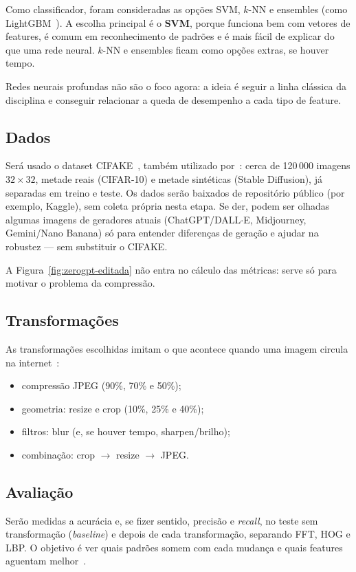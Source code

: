 \documentclass[12pt]{article}
\begin{document}
Como classificador, foram consideradas as opções SVM, $k$-NN e ensembles (como LightGBM~\cite{nirob2026handcrafted}). A escolha principal é o \textbf{SVM}, porque funciona bem com vetores de features, é comum em reconhecimento de padrões e é mais fácil de explicar do que uma rede neural. $k$-NN e ensembles ficam como opções extras, se houver tempo.

Redes neurais profundas não são o foco agora: a ideia é seguir a linha clássica da disciplina e conseguir relacionar a queda de desempenho a cada tipo de feature.

\subsection{Dados}

Será usado o dataset CIFAKE~\cite{bird2024cifake}, também utilizado por~\cite{nirob2026handcrafted}: cerca de 120\,000 imagens $32{\times}32$, metade reais (CIFAR-10) e metade sintéticas (Stable Diffusion), já separadas em treino e teste. Os dados serão baixados de repositório público (por exemplo, Kaggle), sem coleta própria nesta etapa. Se der, podem ser olhadas algumas imagens de geradores atuais (ChatGPT/DALL$\cdot$E, Midjourney, Gemini/Nano Banana) só para entender diferenças de geração e ajudar na robustez --- sem substituir o CIFAKE.

A Figura~\ref{fig:zerogpt-editada} não entra no cálculo das métricas: serve só para motivar o problema da compressão.

\subsection{Transformações}

As transformações escolhidas imitam o que acontece quando uma imagem circula na internet~\cite{bammey2024synthbuster,choi2025warpad}:

\begin{itemize}
\item compressão JPEG (90\%, 70\% e 50\%);
\item geometria: resize e crop (10\%, 25\% e 40\%);
\item filtros: blur (e, se houver tempo, sharpen/brilho);
\item combinação: crop $\rightarrow$ resize $\rightarrow$ JPEG.
\end{itemize}

\subsection{Avaliação}

Serão medidas a acurácia e, se fizer sentido, precisão e \emph{recall}, no teste sem transformação (\emph{baseline}) e depois de cada transformação, separando FFT, HOG e LBP. O objetivo é ver quais padrões somem com cada mudança e quais features aguentam melhor~\cite{frank2020frequency,nirob2026handcrafted,bammey2024synthbuster}.



\end{document}
